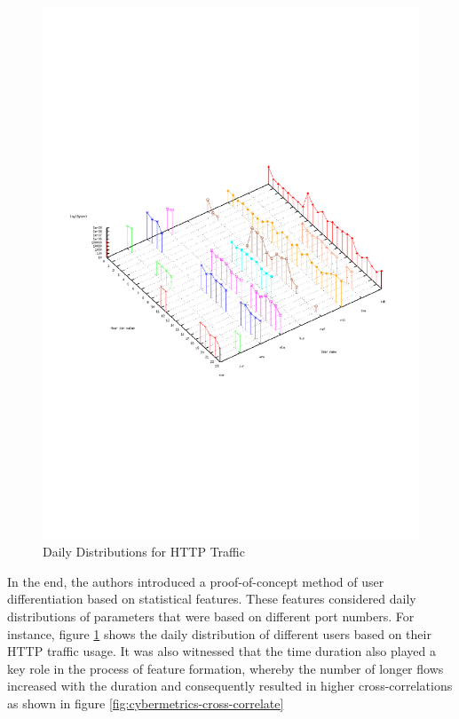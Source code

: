 \begin{figure}[h!]
\begin{center}
  \includegraphics* [width=0.6\linewidth]{figures/cybermetrics-daily-distrib}	
  \caption{Daily Distributions for HTTP Traffic \cite{nmelnikov:thesis:2010}}
  \label{fig:cybermetrics-daily-distrib}
\end{center}
\end{figure}
In the end, the authors introduced a proof-of-concept method of user differentiation based on statistical features. These features considered daily distributions of parameters that were based on different port numbers. For instance, figure \ref{fig:cybermetrics-daily-distrib} shows the daily distribution of different users based on their \ac{HTTP} traffic usage. It was also witnessed that the time duration also played a key role in the process of feature formation, whereby the number of longer flows increased with the duration and consequently resulted in higher cross-correlations as shown in figure \ref{fig:cybermetrics-cross-correlate}  
